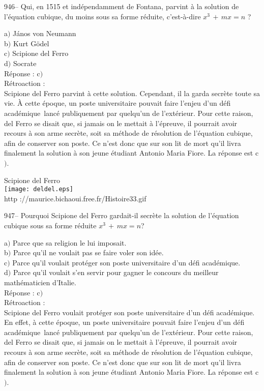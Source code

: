﻿\documentclass[letterpaper, 12pt]{article}
\begin{document}
946-- Qui, en 1515 et ind\'ependamment de Fontana, parvint \`a la
solution de l'\'equation cubique, du moins sous sa forme r\'eduite,
c'est-\`a-dire $x^3\,+\,mx=n$ ?

a$)$ J\'anos von Neumann\\
b$)$ Kurt G\"odel  \\
c$)$ Scipione del Ferro \\
d$)$ Socrate\\

R\'eponse : c$)$\\

R\'etroaction : \\
Scipione del Ferro parvint \`a cette solution. Cependant, il la
garda secr\`ete toute sa vie. \`A cette \'epoque, un poste
universitaire pouvait faire l'enjeu d'un \og d\'efi acad\'emique\fg\
lanc\'e publiquement par quelqu'un de l'ext\'erieur. Pour cette
raison, del Ferro se disait que, si jamais on le mettait \`a
l'\'epreuve, il pourrait avoir recours \`a son arme secr\`ete, soit
sa m\'ethode de r\'esolution de l'\'equation cubique, afin de
conserver son poste. Ce n'est donc que sur son lit de mort qu'il
livra finalement la solution \`a son jeune
\'etudiant Antonio Maria Fiore. La r\'eponse est c$)$.\\

        \begin{center}
        Scipione del Ferro\\
    \texttt{[image: deldel.eps]}\\
        {\footnotesize http ://maurice.bichaoui.free.fr/Histoire33.gif}
    \end{center}

947-- Pourquoi Scipione del Ferro gardait-il secr\`ete la solution
de l'\'equation cubique sous sa forme r\'eduite $x^3\,+\,mx=n$?

a$)$ Parce que sa religion le lui imposait. \\
b$)$ Parce qu'il ne voulait pas se faire voler son id\'ee. \\
c$)$ Parce qu'il voulait prot\'eger son poste universitaire d'un \og
d\'efi acad\'emique\fg . \\
d$)$ Parce qu'il voulait s'en servir pour gagner le concours du meilleur
math\'ematicien d'Italie.\\

R\'eponse : c$)$\\

R\'etroaction :\\
Scipione del Ferro voulait prot\'eger son poste universitaire d'un
\og d\'efi acad\'emique\fg . En effet, \`a cette \'epoque, un poste
universitaire pouvait faire l'enjeu d'un \og d\'efi acad\'emique\fg\
lanc\'e publiquement par quelqu'un de l'ext\'erieur. Pour cette
raison, del Ferro se disait que, si jamais on le mettait \`a
l'\'epreuve, il pourrait avoir recours \`a son arme secr\`ete, soit
sa m\'ethode de r\'esolution de l'\'equation cubique, afin de
conserver son poste. Ce n'est donc que sur son lit de mort qu'il
livra finalement la solution \`a son jeune
\'etudiant Antonio Maria Fiore. La r\'eponse est c$)$.\\
\end{document}
